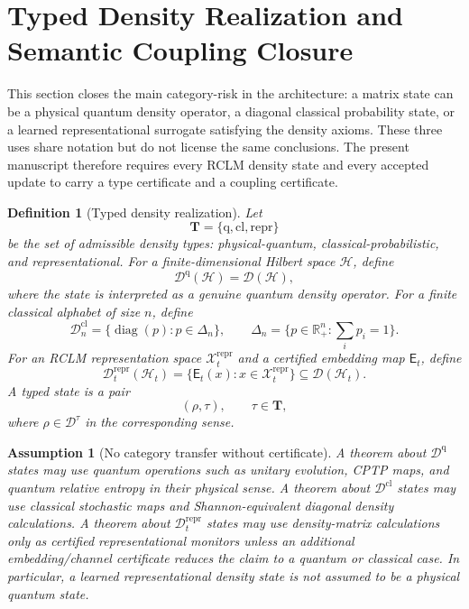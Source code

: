 \documentclass[11pt,a4paper]{article}
\newtheorem{definition}[theorem]{Definition}
\newtheorem{assumption}[theorem]{Assumption}
\newcommand{\D}{\mathcal D}
\newcommand{\Hcal}{\mathcal H}
\newcommand{\Xcal}{\mathcal X}
\newcommand{\qtype}{\mathrm{q}}
\newcommand{\cltype}{\mathrm{cl}}
\newcommand{\reptype}{\mathrm{repr}}
\begin{document}
\section{Typed Density Realization and Semantic Coupling Closure}
\label{sec:typed-density-coupling}

This section closes the main category-risk in the architecture: a matrix state can be a physical quantum density operator, a diagonal classical probability state, or a learned representational surrogate satisfying the density axioms. These three uses share notation but do not license the same conclusions. The present manuscript therefore requires every RCLM density state and every accepted update to carry a type certificate and a coupling certificate.

\begin{definition}[Typed density realization]
Let
\[
\mathbf T=\{\qtype,\cltype,\reptype\}
\]
be the set of admissible density types: physical-quantum, classical-probabilistic, and representational. For a finite-dimensional Hilbert space \(\Hcal\), define
\[
\D^{\qtype}(\Hcal)=\D(\Hcal),
\]
where the state is interpreted as a genuine quantum density operator. For a finite classical alphabet of size \(n\), define
\[
\D^{\cltype}_n=\{\operatorname{diag}(p):p\in\Delta_n\},
\qquad
\Delta_n=\{p\in\mathbb R_+^n:\sum_i p_i=1\}.
\]
For an RCLM representation space \(\Xcal_t^{\reptype}\) and a certified embedding map \(\mathsf E_t\), define
\[
\D_t^{\reptype}(\Hcal_t)=\{\mathsf E_t(x):x\in\Xcal_t^{\reptype}\}\subseteq\D(\Hcal_t).
\]
A typed state is a pair
\[
(\rho,\tau),\qquad \tau\in\mathbf T,
\]
where \(\rho\in\D^\tau\) in the corresponding sense.
\end{definition}

\begin{assumption}[No category transfer without certificate]
A theorem about \(\D^{\qtype}\) states may use quantum operations such as unitary evolution, CPTP maps, and quantum relative entropy in their physical sense. A theorem about \(\D^{\cltype}\) states may use classical stochastic maps and Shannon-equivalent diagonal density calculations. A theorem about \(\D_t^{\reptype}\) states may use density-matrix calculations only as certified representational monitors unless an additional embedding/channel certificate reduces the claim to a quantum or classical case. In particular, a learned representational density state is not assumed to be a physical quantum state.
\end{assumption}
\end{document}
